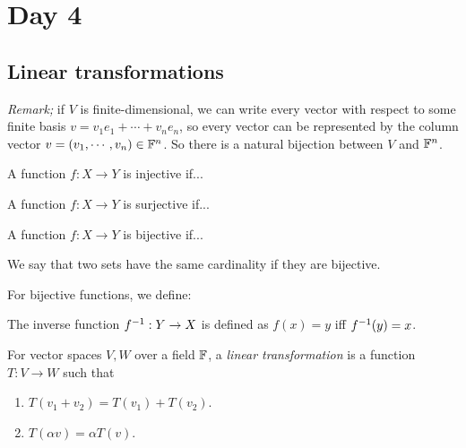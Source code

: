 
\pagebreak
\section{Day 4}

\subsection{Linear transformations}
\emph{Remark;} if $V$ is finite-dimensional, we can write every vector with respect to some finite basis $v=v_1 e_1 + \cdots + v_n e_n$, so every vector can be represented by the column vector $v=(v_1,\cdots,v_n)\in\mathbb{F}^n$. So there is a natural bijection between $V$ and $\mathbb{F}^n$.

\begin{definition}
  A function $f:X\to Y$ is injective if...
\end{definition}
\begin{definition}
  A function $f:X\to Y$ is surjective if...
\end{definition}
\begin{definition}
  A function $f:X\to Y$ is bijective if...
\end{definition}

We say that two sets have the same cardinality if they are bijective.

For bijective functions, we define:
\begin{definition}
  The inverse function $f^{-1}:Y\to X$ is defined as $f(x)=y$ iff $f^{-1}(y)=x$.
\end{definition}

\begin{definition}
  For vector spaces $V,W$ over a field $\mathbb{F}$, a \emph{linear transformation} is a function $T:V\to W$ such that
  \begin{enumerate}[(1)]
    \item $T(v_1+v_2)=T(v_1)+T(v_2)$.
    \item $T(\alpha v) = \alpha T(v)$.
  \end{enumerate}
\end{definition}

